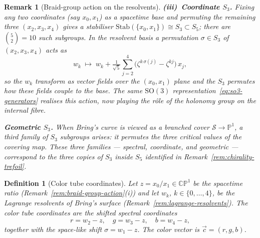 \documentclass[12pt,a4paper]{report}
\newtheorem{definition}[theorem]{Definition}
\newtheorem{remark}[theorem]{Remark}
\begin{document}
\begin{remark}[Braid-group action on the resolvents]
\medskip
\noindent\textbf{(iii)~Coordinate $S_3$.}\;
Fixing any two coordinates (say $x_0,x_1$) as a spacetime base and
permuting the remaining three $(x_2,x_3,x_4)$ gives a stabiliser
$\mathrm{Stab}(\{x_0,x_1\})\cong S_3\subset S_5$; there are
$\binom{5}{2}=10$ such subgroups.  In the resolvent basis a
permutation $\sigma\in S_3$ of $(x_2,x_3,x_4)$ acts as
\begin{equation}\label{eq:coord-s3-shift}
  w_k\;\longmapsto\;
  w_k+\tfrac{1}{\sqrt{5}}\sum_{j=2}^{4}
    \bigl(\zeta^{k\,\sigma(j)}-\zeta^{kj}\bigr)\,x_j,
\end{equation}
so the $w_k$ transform as vector fields over the $(x_0,x_1)$ plane and
the $S_3$ permutes how these fields couple to the base.  The same
$\mathrm{SO}(3)$ representation~\eqref{eq:so3-generators} realises this
action, now playing the r\^ole of the holonomy group on the internal
fibre.

\medskip
\noindent\textbf{Geometric $S_3$.}\;
When Bring's curve is viewed as a branched cover
$\mathcal{S}\to\mathbb{P}^1$, a third family of $S_3$ subgroups arises:
it permutes the three critical values of the covering map.  These three
families --- spectral, coordinate, and geometric --- correspond to the
three copies of $S_3$ inside $S_5$ identified in
Remark~\ref{rem:chirality-trefoil}.
\end{remark}

\begin{definition}[Color tube coordinates]
\label{def:color-tube-coordinates}
  Let $z = x_0/x_1 \in \mathbb{CP}^1$ be the spacetime ratio
  (Remark~\ref{rem:braid-group-action}\textup{(i)}) and let $w_k$,
  $k \in \{0,\dots,4\}$, be the Lagrange resolvents of Bring's surface
  (Remark~\ref{rem:lagrange-resolvents}).  The \emph{color tube coordinates}
  are the shifted spectral coordinates
  \begin{equation}\label{eq:color-tube-coords}
    r = w_2 - z, \quad g = w_3 - z, \quad b = w_4 - z,
  \end{equation}
  together with the space-like shift $\sigma = w_1 - z$.  The
  \emph{color vector} is $\vec{c} = (r, g, b)$.
\end{definition}
\end{document}
